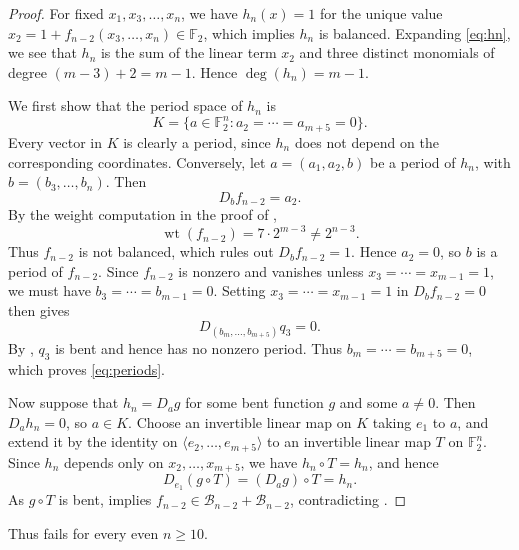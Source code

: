 \documentclass{amsart}
\numberwithin{equation}{section}
\theoremstyle{plain}
\theoremstyle{definition}
\theoremstyle{remark}
\DeclareMathOperator{\wt}{wt}
\newcommand{\F}{\mathbb{F}_2}
\newcommand{\B}{\mathcal{B}}
\begin{document}
\begin{proof}
For fixed $x_1,x_3,\ldots,x_n$, we have $h_n(x)=1$ for the unique value $x_2=1+f_{n-2}(x_3,\ldots,x_n)\in\F$, which implies $h_n$ is balanced.
Expanding \eqref{eq:hn}, we see that $h_n$ is the sum of
the linear term $x_2$ and three distinct monomials of degree $(m-3)+2=m-1$. Hence $\deg(h_n)=m-1$.

We first show that the period space of $h_n$ is
\begin{equation}
 \label{eq:periods}
 K=\{a\in\F^n:a_2=\cdots=a_{m+5}=0\}.
\end{equation}
Every vector in $K$ is clearly a period, since $h_n$ does not
depend on the corresponding coordinates. Conversely, let
$a=(a_1,a_2,b)$ be a period of $h_n$, with
$b=(b_3,\ldots,b_n)$. Then
\[
 D_bf_{n-2}=a_2.
\]
By the weight computation in the proof of ,
\[
 \wt(f_{n-2})=7\cdot 2^{m-3}\ne 2^{n-3}.
\]
Thus $f_{n-2}$ is not balanced, which rules out
$D_bf_{n-2}=1$. Hence $a_2=0$, so $b$ is a period of $f_{n-2}$.
Since $f_{n-2}$ is nonzero and vanishes unless
$x_3=\cdots=x_{m-1}=1$, we must have
$b_3=\cdots=b_{m-1}=0$.
Setting $x_3=\cdots=x_{m-1}=1$ in $D_bf_{n-2}=0$ then gives
\[
 D_{(b_m,\ldots,b_{m+5})}q_3=0.
\]
By , $q_3$ is bent and hence has
no nonzero period. Thus $b_m=\cdots=b_{m+5}=0$,
which proves \eqref{eq:periods}.

Now suppose that $h_n=D_ag$ for some bent function $g$ and
some $a\ne0$. Then $D_ah_n=0$, so $a\in K$.
Choose an invertible linear map on $K$ taking $e_1$ to $a$,
and extend it by the identity on
$\langle e_2,\ldots,e_{m+5}\rangle$ to an invertible linear
map $T$ on $\F^n$.
Since $h_n$ depends only on $x_2,\ldots,x_{m+5}$, we have
$h_n\circ T=h_n$, and hence
\[
 D_{e_1}(g\circ T)=(D_ag)\circ T=h_n.
\]
As $g\circ T$ is bent,  implies
$f_{n-2}\in\B_{n-2}+\B_{n-2}$, contradicting
.
\end{proof}
Thus  fails for every even $n\ge 10$.
\end{document}
